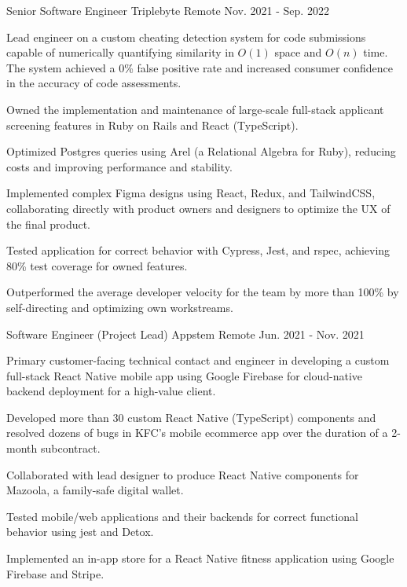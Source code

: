 \begin{cventries}
  \cventry
    {Senior Software Engineer} %
    {Triplebyte} %
    {Remote} %
    {Nov. 2021 - Sep. 2022} %
    {
      \begin{cvitems} %
        \item {Lead engineer on a custom cheating detection system for code submissions capable of numerically quantifying similarity in $O(1)$ space and $O(n)$ time. The system achieved a 0\% false positive rate and increased consumer confidence in the accuracy of code assessments.}
        \item {Owned the implementation and maintenance of large-scale full-stack applicant screening features in Ruby on Rails and React (TypeScript).}
        \item {Optimized Postgres queries using Arel (a Relational Algebra for Ruby), reducing costs and improving performance and stability.}
        \item {Implemented complex Figma designs using React, Redux, and TailwindCSS, collaborating directly with product owners and designers to optimize the UX of the final product.}
        \item {Tested application for correct behavior with Cypress, Jest, and rspec, achieving 80\% test coverage for owned features.}
        \item {Outperformed the average developer velocity for the team by more than 100\% by self-directing and optimizing own workstreams.}
      \end{cvitems}
    }

  \cventry
    {Software Engineer (Project Lead)} %
    {Appstem} %
    {Remote} %
    {Jun. 2021 - Nov. 2021} %
    {
      \begin{cvitems} %
        \item {Primary customer-facing technical contact and engineer in developing a custom full-stack React Native mobile app using Google Firebase for cloud-native backend deployment for a high-value client.}
        \item {Developed more than 30 custom React Native (TypeScript) components and resolved dozens of bugs in KFC's mobile ecommerce app over the duration of a 2-month subcontract.}
        \item {Collaborated with lead designer to produce React Native components for Mazoola, a family-safe digital wallet.}
        \item {Tested mobile/web applications and their backends for correct functional behavior using jest and Detox.}
        \item {Implemented an in-app store for a React Native fitness application using Google Firebase and Stripe.}
      \end{cvitems}
    }


\end{cventries}
